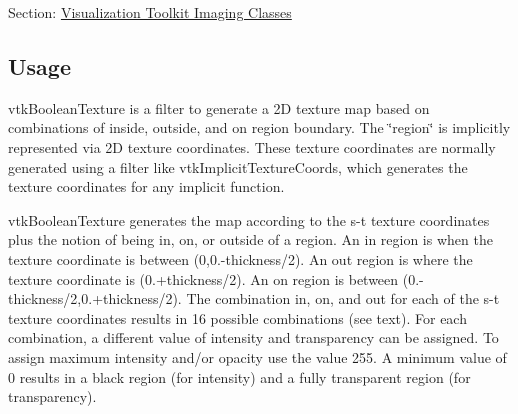 Section\-: \hyperlink{sec_vtkimaging}{Visualization Toolkit Imaging Classes} \hypertarget{vtkwidgets_vtkxyplotwidget_Usage}{}\subsection{Usage}\label{vtkwidgets_vtkxyplotwidget_Usage}
vtk\-Boolean\-Texture is a filter to generate a 2\-D texture map based on combinations of inside, outside, and on region boundary. The \char`\"{}region\char`\"{} is implicitly represented via 2\-D texture coordinates. These texture coordinates are normally generated using a filter like vtk\-Implicit\-Texture\-Coords, which generates the texture coordinates for any implicit function.

vtk\-Boolean\-Texture generates the map according to the s-\/t texture coordinates plus the notion of being in, on, or outside of a region. An in region is when the texture coordinate is between (0,0.-\/thickness/2). An out region is where the texture coordinate is (0.+thickness/2). An on region is between (0.-\/thickness/2,0.+thickness/2). The combination in, on, and out for each of the s-\/t texture coordinates results in 16 possible combinations (see text). For each combination, a different value of intensity and transparency can be assigned. To assign maximum intensity and/or opacity use the value 255. A minimum value of 0 results in a black region (for intensity) and a fully transparent region (for transparency).

